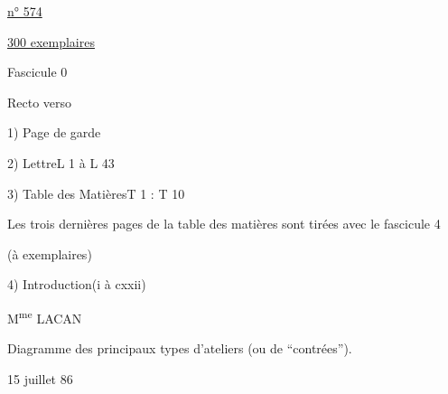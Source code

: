 \hfill\uline{n° 574}

\hfill\uline{300 exemplaires}

Fascicule 0

Recto verso

1) Page de garde

2) Lettre\qquad L 1 à L 43

3) Table des Matières\qquad T 1 : T 10

Les trois dernières pages de la table des matières sont tirées avec le fascicule 4

(à  exemplaires)

4) Introduction\qquad (i à cxxii)

\hfill M\textsuperscript{me} LACAN


Diagramme des principaux types d'ateliers (ou de ``contrées'').

15 juillet 86

